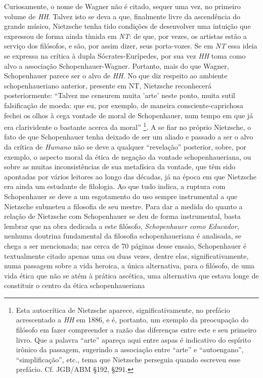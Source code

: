 \documentclass[
	12pt,				%
	openright,			%
	oneside,			%
	a4paper,			%
	english,			%
	french,				%
	spanish,			%
	brazil				%
	]{abntex2}
\newcommand{\Hum}{\textit{Humano}\xspace}
\begin{document}
	Curiosamente, o nome de Wagner não é citado, sequer uma vez, no primeiro volume de \textit{HH}. Talvez isto se deva a que, finalmente livre da ascendência do grande músico, Nietzsche tenha tido condições de desenvolver uma intuição que expressou de forma ainda tímida em \textit{NT}: de que, por vezes, os artistas estão a serviço dos filósofos, e são, por assim dizer, seus porta-vozes. Se em \textit{NT} essa ideia se expressa na crítica à dupla Sócrates-Eurípedes, por sua vez \textit{HH} toma como alvo a associação Schopenhauer-Wagner. Portanto, mais do que Wagner, Schopenhauer parece ser o alvo de \textit{HH}. No que diz respeito ao ambiente schopenhaueriano anterior, presente em NT, Nietzsche reconhecerá posteriormente: “Talvez me censurem muita 'arte' neste ponto, muita sutil falsificação de moeda: que eu, por exemplo, de maneira consciente-caprichosa fechei os olhos à cega vontade de moral de Schopenhauer, num tempo em que já era clarividente o bastante acerca da moral”
\footnote{Esta autocrítica de Nietzsche aparece, significativamente, no prefácio acrescentado a \textit{HH} em 1886, e é, portanto, um exemplo da preocupação do filósofo em fazer compreender a razão das diferenças entre este e seu primeiro livro. Que a palavra “arte” apareça aqui entre aspas é indicativo do espírito irônico da passagem, sugerindo a associação entre “arte” e “autoengano”, “simplificação”, etc., tema que Nietzsche perseguia quando escreveu esse prefácio. Cf. JGB/ABM §192, §291.}.
A se fiar no próprio Nietzsche, o fato de que Schopenhauer tenha deixado de ser um aliado e passado a ser o alvo da crítica de \Hum não se deve a qualquer “revelação” posterior, sobre, por exemplo, o aspecto moral da ética de negação da vontade schopenhaueriana, ou sobre as muitas inconsistências de sua metafísica da vontade, que têm sido apontadas por vários leitores ao longo das décadas, já na época em que Nietzsche era ainda um estudante de filologia. Ao que tudo indica, a ruptura com Schopenhauer se deve a um esgotamento do uso sempre instrumental a que Nietzsche submeteu a filosofia de seu mestre. Para dar a medida do quanto a relação de Nietzsche com Schopenhauer se deu de forma instrumental, basta lembrar que na obra dedicada a este filósofo, \textit{Schopenhauer como Educador}, nenhuma doutrina fundamental da filosofia schopenhaueriana é analisada, se chega a ser mencionada; nas cerca de 70 páginas desse ensaio, Schopenhauer é textualmente citado apenas uma ou duas vezes, dentre elas, significativamente, numa passagem sobre a vida heroica, a única alternativa, para o filósofo, de uma vida ética que não se atém à prática ascética, uma alternativa que estava longe de constituir o centro da ética schopenhaueriana
\end{document}
